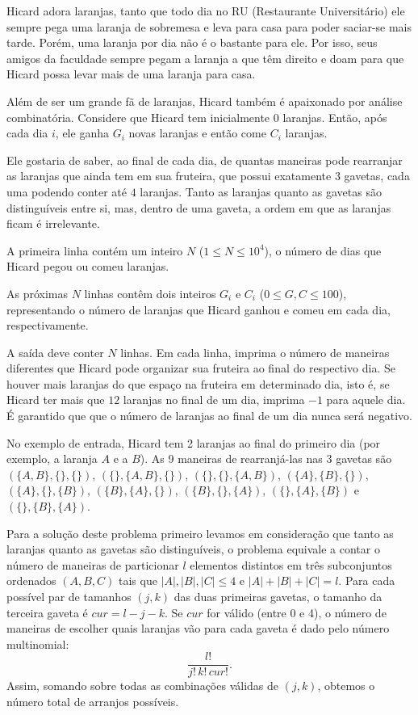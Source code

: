 Hicard adora laranjas, tanto que todo dia no RU (Restaurante Universitário) ele sempre pega uma laranja de sobremesa e leva para casa para poder saciar-se mais tarde.  
Porém, uma laranja por dia não é o bastante para ele. Por isso, seus amigos da faculdade sempre pegam a laranja a que têm direito e doam para que Hicard possa levar mais de uma laranja para casa.

Além de ser um grande fã de laranjas, Hicard também é apaixonado por análise combinatória.
Considere que Hicard tem inicialmente $0$ laranjas. Então, após cada dia $i$, ele ganha $G_i$ novas laranjas e então come $C_i$ laranjas.

Ele gostaria de saber, ao final de cada dia, de quantas maneiras pode rearranjar as laranjas que ainda tem em sua fruteira, que possui exatamente $3$ gavetas, cada uma podendo conter até $4$ laranjas. Tanto as laranjas quanto as gavetas são distinguíveis entre si, mas, dentro de uma gaveta, a ordem em que as laranjas ficam é irrelevante.


A primeira linha contém um inteiro $N$ ($1 \le N \le 10^4$), o número de dias que Hicard pegou ou comeu laranjas.

As próximas $N$ linhas contêm dois inteiros $G_i$ e $C_i$ ($0 \le G, C \le 100$), representando o número de laranjas que Hicard ganhou e comeu em cada dia, respectivamente.


A saída deve conter $N$ linhas.  
Em cada linha, imprima o número de maneiras diferentes que Hicard pode organizar sua fruteira ao final do respectivo dia.
Se houver mais laranjas do que espaço na fruteira em determinado dia, isto é, se Hicard ter mais que $12$ laranjas no final de um dia, imprima $-1$ para aquele dia.
É garantido que que o número de laranjas ao final de um dia nunca será negativo.

No exemplo de entrada, Hicard tem 2 laranjas ao final do primeiro dia (por exemplo, a laranja $A$ e a $B$). As 9 maneiras de rearranjá-las nas 3 gavetas são
$(\{A,B\},\{\},\{\})$, $(\{\},\{A,B\},\{\})$, $(\{\},\{\},\{A,B\})$,
$(\{A\},\{B\},\{\})$, $(\{A\},\{\},\{B\})$, $(\{B\},\{A\},\{\})$,
$(\{B\},\{\},\{A\})$, $(\{\},\{A\},\{B\})$ e $(\{\},\{B\},\{A\})$.

Para a solução deste problema primeiro levamos em consideração que tanto as laranjas quanto as gavetas são distinguíveis, o problema equivale a contar o número de maneiras de particionar \(l\) elementos distintos em três subconjuntos ordenados \((A, B, C)\) tais que \(|A|, |B|, |C| \leq 4\) e \(|A| + |B| + |C| = l\).  
Para cada possível par de tamanhos \((j, k)\) das duas primeiras gavetas, o tamanho da terceira gaveta é \(cur = l - j - k\). Se \(cur\) for válido (entre 0 e 4), o número de maneiras de escolher quais laranjas vão para cada gaveta é dado pelo número multinomial:
\[
\frac{l!}{j! \, k! \, cur!}.
\]
Assim, somando sobre todas as combinações válidas de \((j, k)\), obtemos o número total de arranjos possíveis. 

